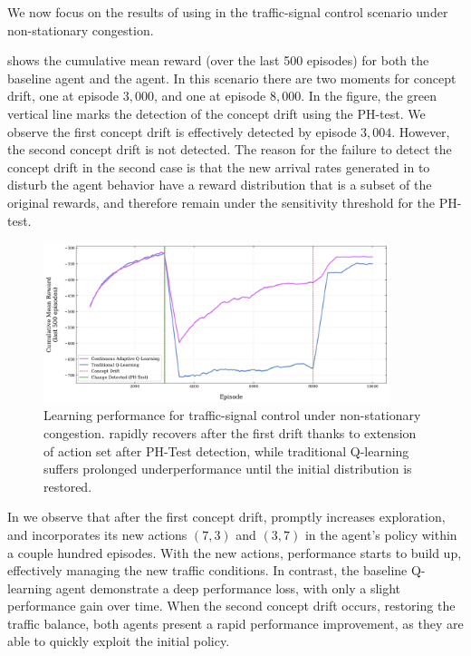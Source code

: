 We now focus on the results of using \adaptiverl in the traffic-signal control scenario under 
non-stationary congestion.  

 shows the cumulative mean reward (over the last 500 episodes) for 
both the baseline agent and the \adaptiverl agent. In this scenario there are two moments for concept 
drift, one at episode $3,000$, and one at episode $8,000$. In the figure, the green vertical line marks 
the detection of the concept drift using the PH-test. We observe the first concept drift is effectively  
detected by episode $3,004$. However, the second concept drift is not detected. The reason for the 
failure to detect the concept drift in the second case is that the new arrival rates generated in to disturb 
the agent behavior have a reward distribution that is a subset of the original rewards, and therefore 
remain under the sensitivity threshold for the PH-test.

\begin{figure}[hptb]
    \centering
    \includegraphics[width=0.9\textwidth]{figures/traffic_learning_curve}
    \caption{Learning performance for traffic-signal control under non-stationary congestion. \adaptiverl rapidly recovers after the first drift thanks to extension of action set after PH-Test detection, while traditional Q-learning suffers prolonged underperformance until the initial distribution is restored.}
    \label{fig:traffic-learning-curve}
\end{figure}

In  we observe that after the first concept drift, \adaptiverl promptly 
increases exploration, and incorporates its new actions $(7,3)$ and $(3,7)$ in the agent's policy within 
a couple hundred episodes. With the new actions, performance starts to build up, effectively 
managing the new traffic conditions. In contrast, the baseline Q-learning agent demonstrate a deep 
performance loss, with only a slight performance gain over time. When the second concept drift 
occurs, restoring the traffic balance, both agents present a rapid performance improvement, as they 
are able to quickly exploit the initial policy. 

